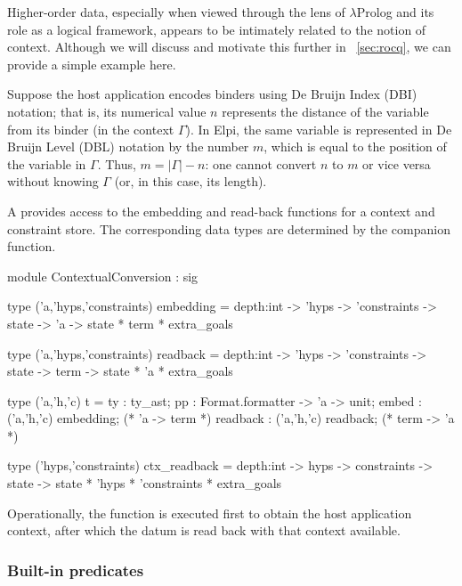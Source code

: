 \documentclass[a4paper, 11pt]{book}
\begin{document}
Higher-order data, especially when viewed through the lens of $\lambda$Prolog
and its role as a logical framework, appears to be intimately related to the
notion of context. Although we will discuss and motivate this further in
~\cref{sec:rocq}, we can provide a simple example here.

Suppose the host application encodes binders using De Bruijn Index (DBI)
notation; that is, its numerical value $n$ represents the distance of the
variable from its binder (in the context $\Gamma$). In Elpi, the same variable
is represented in De Bruijn Level (DBL) notation by the number $m$, which is
equal to the position of the variable in $\Gamma$. Thus, $m = |\Gamma| - n$:
one cannot convert $n$ to $m$ or vice versa without knowing $\Gamma$ (or, in
this case, its length).

A  provides access to the embedding and
read-back functions for a context and constraint store. The corresponding data
types are determined by the  companion function.

\begin{ocamlcode}
module ContextualConversion : sig

type ('a,'hyps,'constraints) embedding =
  depth:int -> 'hyps -> 'constraints ->
  state -> 'a -> state * term * extra_goals

type ('a,'hyps,'constraints) readback =
  depth:int -> 'hyps -> 'constraints ->
  state -> term -> state * 'a * extra_goals

type ('a,'h,'c) t = {
  ty : ty_ast;
  pp : Format.formatter -> 'a -> unit;
  embed : ('a,'h,'c) embedding;   (* 'a -> term *)
  readback : ('a,'h,'c) readback; (* term -> 'a *)
}

type ('hyps,'constraints) ctx_readback =
  depth:int -> hyps -> constraints ->
  state -> state * 'hyps * 'constraints * extra_goals
\end{ocamlcode}

\noindent
Operationally, the  function is executed first to obtain
the host application context, after which the datum is read back with that
context available.

\subsubsection{Built-in predicates}\label{sec:builtins}
\end{document}
